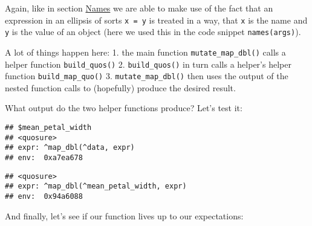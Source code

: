 \documentclass[]{book}
\newenvironment{Shaded}{\begin{snugshade}}{\end{snugshade}}
\newcommand{\DataTypeTok}[1]{\textcolor[rgb]{0.13,0.29,0.53}{#1}}
\newcommand{\KeywordTok}[1]{\textcolor[rgb]{0.13,0.29,0.53}{\textbf{#1}}}
\newcommand{\NormalTok}[1]{#1}
\newcommand{\OperatorTok}[1]{\textcolor[rgb]{0.81,0.36,0.00}{\textbf{#1}}}
\newcommand{\StringTok}[1]{\textcolor[rgb]{0.31,0.60,0.02}{#1}}
\begin{document}
Again, like in section \protect\hyperlink{named}{Names} we are able to make use of the fact that an expression in an ellipsis of sorts \texttt{x\ =\ y} is treated in a way, that \texttt{x} is the name and \texttt{y} is the value of an object (here we used this in the code snippet \texttt{names(args)}).

A lot of things happen here:
1. the main function \texttt{mutate\_map\_dbl()} calls a helper function \texttt{build\_quos()}
2. \texttt{build\_quos()} in turn calls a helper's helper function \texttt{build\_map\_quo()}
3. \texttt{mutate\_map\_dbl()} then uses the output of the nested function calls to (hopefully) produce the desired result.

What output do the two helper functions produce? Let's test it:

\begin{Shaded}
\end{Shaded}

\begin{verbatim}
## $mean_petal_width
## <quosure>
## expr: ^map_dbl(^data, expr)
## env:  0xa7ea678
\end{verbatim}

\begin{Shaded}
\end{Shaded}

\begin{verbatim}
## <quosure>
## expr: ^map_dbl(^mean_petal_width, expr)
## env:  0x94a6088
\end{verbatim}

And finally, let's see if our function lives up to our expectations:

\begin{Shaded}
\end{Shaded}
\end{document}
